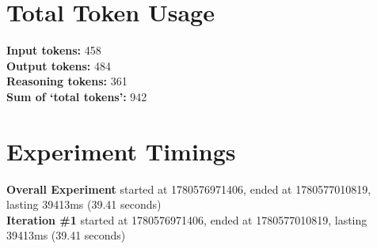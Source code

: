 \documentclass{article}
\begin{document}
\section*{Total Token Usage}
\textbf{Input tokens: }458
\\\textbf{Output tokens: }484
\\\textbf{Reasoning tokens: }361
\\\textbf{Sum of `total tokens': }942
\section*{Experiment Timings}
\textbf{Overall Experiment} started at 1780576971406, ended at 1780577010819, lasting 39413ms (39.41 seconds)
\\\textbf{Iteration \#1} started at 1780576971406, ended at 1780577010819, lasting 39413ms (39.41 seconds)
\end{document}
